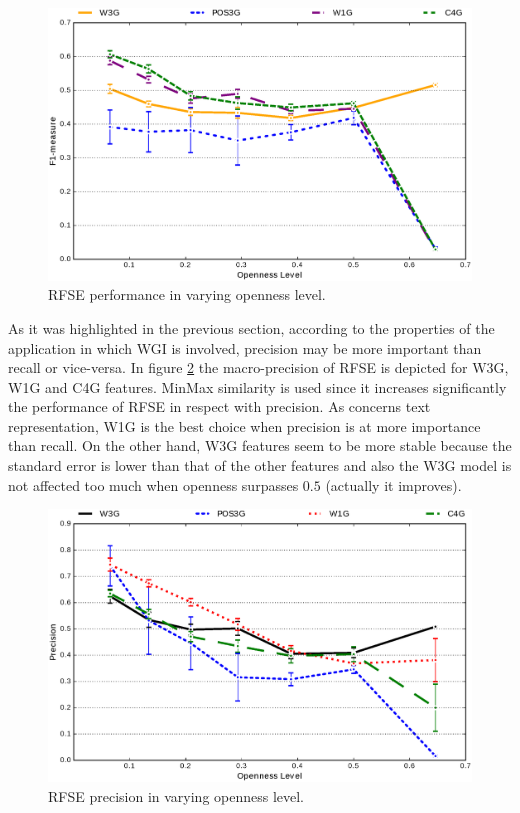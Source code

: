 \begin{figure}[H]
\begin{center}
    \includegraphics[scale=0.45]{Figures/RFSE_MIX_openness_test_graph.eps}
	\caption{RFSE performance in varying openness level.}
	\label{chap:noise:fig:RFSE_openness_test}
\end{center}
\end{figure}


As it was highlighted in the previous section, according to the properties of the application in which WGI is involved, precision may be more important than recall or vice-versa. In figure \ref{chap:noise:fig:RFSE_precision_focus_openness_test} the macro-precision of RFSE is depicted for W3G, W1G and C4G features. MinMax similarity is used since it increases significantly the performance of RFSE in respect with precision. As concerns text representation, W1G is the best choice when precision is at more importance than recall. On the other hand, W3G features seem to be more stable because the standard error is lower than that of the other features and also the W3G model is not affected too much when openness surpasses $0.5$ (actually it improves).

\begin{figure}[H]
\begin{center}
    \includegraphics[scale=0.45]{Figures/RFSE_Precision_Focus_openness_test_graph.eps}
	\caption{RFSE precision in varying openness level.}
	\label{chap:noise:fig:RFSE_precision_focus_openness_test}
\end{center}
\end{figure}

